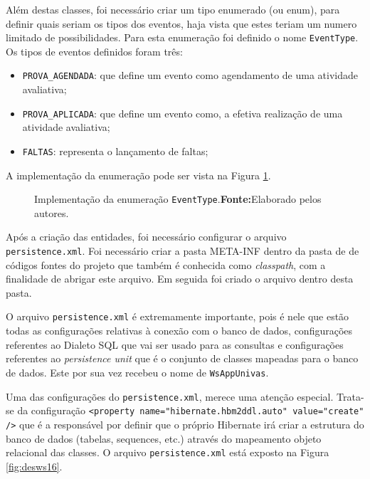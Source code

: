 	\pagebreak
	
	
	\par Além destas classes, foi necessário criar um tipo enumerado (ou enum),
para definir quais seriam os tipos dos eventos, haja vista que estes teriam um
numero limitado de possibilidades. Para esta enumeração foi definido o nome
\texttt{EventType}. Os tipos de eventos definidos foram três:

	\begin{itemize}
	  \item \texttt{PROVA\_AGENDADA}: que define um evento como agendamento de uma
	  atividade avaliativa;
	  \item \texttt{PROVA\_APLICADA}: que define um evento como, a efetiva
	  realização de uma atividade avaliativa;
	  \item \texttt{FALTAS}: representa o lançamento de faltas;
	\end{itemize}
	
	\par A implementação da enumeração pode ser vista na Figura \ref{fig:desws15}.

	\begin{figure}[h!]
		
		\caption[Implementação da enumeração EventType]{Implementação da enumeração
		\texttt{EventType}.\textbf{Fonte:}Elaborado pelos autores.}
		\label{fig:desws15}
	\end{figure}

	\par Após a criação das entidades, foi necessário configurar o arquivo
\texttt{persistence.xml}. Foi necessário criar a pasta META-INF dentro da pasta
de de códigos fontes do projeto que também é conhecida como \textit{classpath},
com a finalidade de abrigar este arquivo. Em seguida foi criado o arquivo
dentro desta pasta. 

	\par O arquivo \texttt{persistence.xml} é extremamente importante, pois é nele
que estão todas as configurações relativas à conexão com o banco de dados,
configurações referentes ao Dialeto SQL que vai ser usado para as consultas e
configurações referentes ao \textit{persistence unit} que é o conjunto de
classes mapeadas para o banco de dados. Este por sua vez recebeu o nome de
\texttt{WsAppUnivas}. 
	\par Uma das configurações do \texttt{persistence.xml}, merece uma atenção
especial. Trata-se da configuração \texttt{<property
name="hibernate.hbm2ddl.auto" value="create" />} que é a responsável por
definir que o próprio Hibernate irá criar a estrutura do banco de dados
(tabelas, sequences, etc.) através do mapeamento objeto relacional das classes.
O arquivo \texttt{persistence.xml} está exposto na Figura \ref{fig:desws16}.


